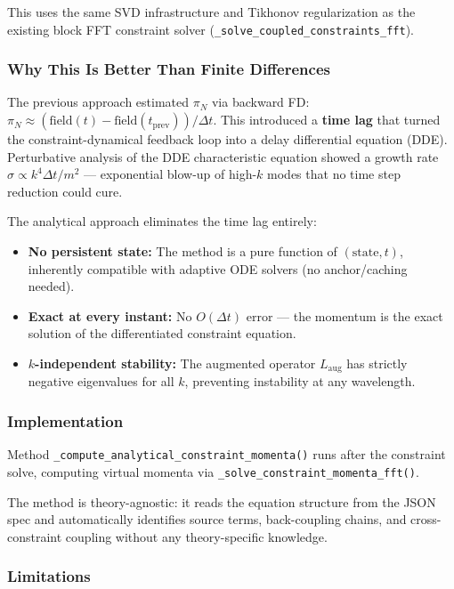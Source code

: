 This uses the same SVD infrastructure and Tikhonov regularization as the
existing block FFT constraint solver (\texttt{\_solve\_coupled\_constraints\_fft}).

\subsubsection{Why This Is Better Than Finite Differences}
\label{sec:cf-why-analytical}

The previous approach estimated $\pi_N$ via backward FD:
$\pi_N \approx (\text{field}(t) - \text{field}(t_\mathrm{prev})) / \Delta t$. This introduced a \textbf{time lag} that
turned the constraint-dynamical feedback loop into a delay differential
equation (DDE). Perturbative analysis of the DDE characteristic equation
showed a growth rate $\sigma \propto k^4 \Delta t / m^2$ --- exponential blow-up of high-$k$ modes
that no time step reduction could cure.

The analytical approach eliminates the time lag entirely:

\begin{itemize}
  \item \textbf{No persistent state:} The method is a pure function of $(\text{state}, t)$,
    inherently compatible with adaptive ODE solvers (no anchor/caching needed).
  \item \textbf{Exact at every instant:} No $O(\Delta t)$ error --- the momentum is the exact
    solution of the differentiated constraint equation.
  \item \textbf{$k$-independent stability:} The augmented operator $L_\mathrm{aug}$ has strictly
    negative eigenvalues for all $k$, preventing instability at any wavelength.
\end{itemize}

\subsubsection{Implementation}
\label{sec:cf-implementation}

Method \texttt{\_compute\_analytical\_constraint\_momenta()} runs after the constraint
solve, computing virtual momenta via \texttt{\_solve\_constraint\_momenta\_fft()}.

The method is theory-agnostic: it reads the equation structure from the JSON
spec and automatically identifies source terms, back-coupling chains, and
cross-constraint coupling without any theory-specific knowledge.

\subsubsection{Limitations}
\label{sec:cf-limitations}

